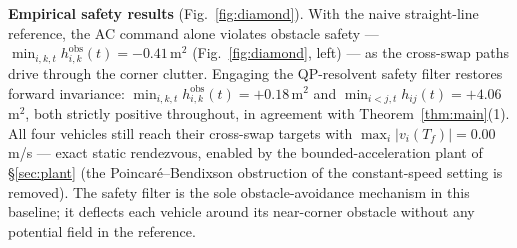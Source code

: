\documentclass[letterpaper,10pt,conference]{IEEEtran}
\begin{document}
\textbf{Empirical safety results} (Fig.~\ref{fig:diamond}). With the naive straight-line reference, the AC command alone violates obstacle safety --- $\min_{i,k,t} h_{i,k}^{\text{obs}}(t) = -0.41$\,m$^2$ (Fig.~\ref{fig:diamond}, left) --- as the cross-swap paths drive through the corner clutter. Engaging the QP-resolvent safety filter restores forward invariance: $\min_{i,k,t} h_{i,k}^{\text{obs}}(t) = +0.18$\,m$^2$ and $\min_{i<j,t} h_{ij}(t) = +4.06$\,m$^2$, both strictly positive throughout, in agreement with Theorem~\ref{thm:main}(1). All four vehicles still reach their cross-swap targets with $\max_i |v_i(T_f)| = 0.00$\,m/s --- exact static rendezvous, enabled by the bounded-acceleration plant of \S\ref{sec:plant} (the Poincar\'e--Bendixson obstruction of the constant-speed setting is removed). The safety filter is the sole obstacle-avoidance mechanism in this baseline; it deflects each vehicle around its near-corner obstacle without any potential field in the reference.
\end{document}
